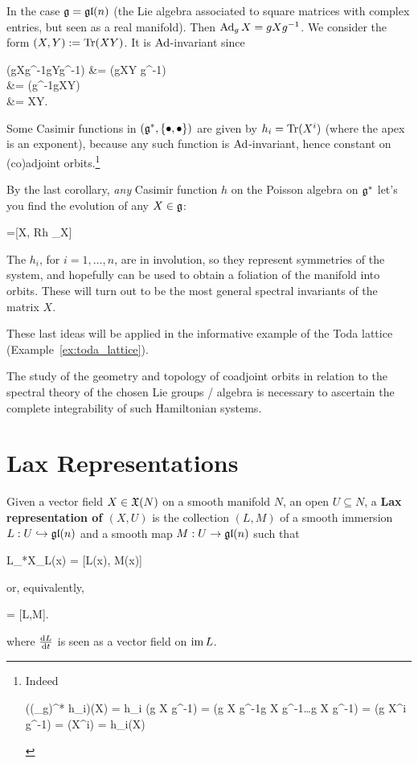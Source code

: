 \documentclass[main.tex]{subfiles}
\begin{document}
\begin{example}
	In the case $\mathfrak g = \mathfrak{gl}(n)$ (the Lie algebra associated to square matrices with complex entries, but seen as a real manifold). Then $\operatorname{Ad}_g X = gXg^{-1}$. We consider the form $(X,Y) := \operatorname{Tr}(XY)$. It is $\operatorname{Ad}$-invariant since
	\begin{eqalign}
		\trace (gXg^{-1}gYg^{-1}) &= \trace (gXY g^{-1})\\
			&= \trace (g^{-1}gXY) \\
			&= \trace XY.
	\end{eqalign}
	Some Casimir functions in $(\mathfrak g^*, \{\bullet,\bullet\})$ are given by $h_i = \operatorname{Tr} (X^i)$ (where the apex is an exponent), because any such function is $\operatorname{Ad}$-invariant, hence constant on (co)adjoint orbits.\footnote{Indeed 
	\begin{eqalign}
		((\Ad_g)^* h_i)(X) = h_i (g X g^{-1}) = \trace(g X g^{-1}g X g^{-1}\dots g X g^{-1}) = \trace(g X^i g^{-1}) = \trace(X^i) = h_i(X)
	\end{eqalign}}

	By the last corollary, \emph{any} Casimir function $h$ on the Poisson algebra on $\mathfrak g^*$ let's you find the evolution of any $X \in \mathfrak g$:
	\begin{eqalign}
	\label{eq:evo_lalg_R_matrix}
		 =[X, R\nabla h \vert_X]
	\end{eqalign}
	The $h_i$, for $i=1,\ldots,n$, are in involution, so they represent symmetries of the system, and hopefully can be used to obtain a foliation of the manifold into orbits. These will turn out to be the most general spectral invariants of the matrix $X$.
\end{example}

These last ideas will be applied in the informative example of the Toda lattice (Example~\ref{ex:toda_lattice}).

\begin{remark}
	The study of the geometry and topology of coadjoint orbits in relation to the spectral theory of the chosen Lie groups / algebra is necessary to ascertain the complete integrability of such Hamiltonian systems.
\end{remark}

\section{Lax Representations}
\begin{definition}
	Given a vector field $X \in \mathfrak{X}(N)$ on a smooth manifold $N$, an open $U \subseteq N$, a \textbf{Lax representation of $(X, U)$} is the collection $(L,M)$ of a smooth immersion $L : U \hookrightarrow \mathfrak{gl}(n)$ and a smooth map $M : U \to \mathfrak{gl}(n)$ such that
	\begin{eqalign}
		L_*X\vert_{L(x)} = [L(x), M(x)]
	\end{eqalign}
	or, equivalently,
	\begin{eqalign}
		 = [L,M].
	\end{eqalign}
	where $\frac{\mathrm{d}{L}}{\mathrm{d}{t}}$ is seen as a vector field on $\operatorname{im} L$.
\end{definition}
\end{document}
